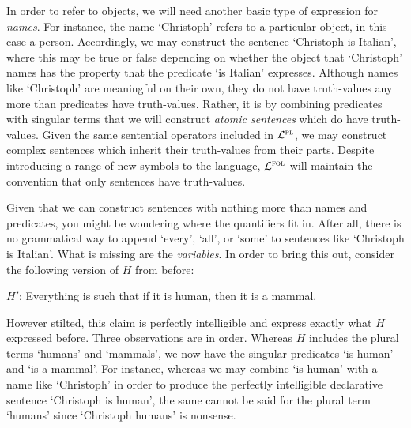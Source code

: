 In order to refer to objects, we will need another basic type of expression for \textit{names}.
For instance, the name `Christoph' refers to a particular object, in this case a person.
Accordingly, we may construct the sentence `Christoph is Italian', where this may be true or false depending on whether the object that `Christoph' names has the property that the predicate `is Italian' expresses.
Although names like `Christoph' are meaningful on their own, they do not have truth-values any more than predicates have truth-values.
Rather, it is by combining predicates with singular terms that we will construct \textit{atomic sentences} which do have truth-values.
Given the same sentential operators included in $\mathcal{L}^{\textsc{pl}}$, we may construct complex sentences which inherit their truth-values from their parts.
Despite introducing a range of new symbols to the language, $\mathcal{L}^{\textsc{fol}}$ will maintain the convention that only sentences have truth-values.

Given that we can construct sentences with nothing more than names and predicates, you might be wondering where the quantifiers fit in.
After all, there is no grammatical way to append `every', `all', or `some' to sentences like `Christoph is Italian'.
What is missing are the \textit{variables}.
In order to bring this out, consider the following version of $H$ from before:

\begin{ekey}
  \item[$H'$:] Everything is such that if it is human, then it is a mammal.
\end{ekey}

However stilted, this claim is perfectly intelligible and express exactly what $H$ expressed before.
Three observations are in order.
Whereas $H$ includes the plural terms `humans' and `mammals', we now have the singular predicates `is human' and `is a mammal'.
For instance, whereas we may combine `is human' with a name like `Christoph' in order to produce the perfectly intelligible declarative sentence `Christoph is human', the same cannot be said for the plural term `humans' since `Christoph humans' is nonsense. 

